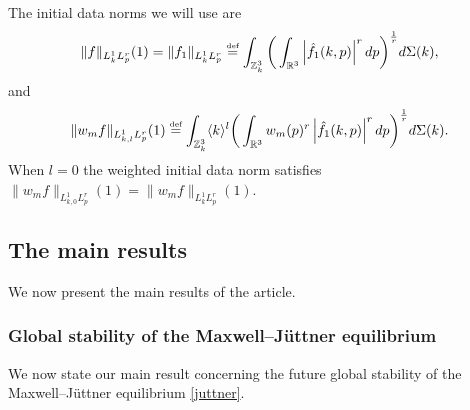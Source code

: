 \documentclass[reqno]{amsart}
\newcommand{\eqdef }{\overset{\mbox{\tiny{def}}}{=}}
\newcommand{\pv}{p}
\def\R{\mathbb R}
\newcommand{\Z}{\mathbb{Z}}
\theoremstyle{definition}
\numberwithin{equation}{section}
\numberwithin{theorem}{section}
\begin{document}
The initial data norms we will use are
\begin{equation*}
\|f\|_{L^1_{k}L^r_{\pv}}(1)= \|f_1\|_{L^1_{k}L^r_{\pv}}
\eqdef
 \int_{\Z^3_{k}} 
\bigg(
\int_{\R^3} 
\left| \hat{f}_1(k,\pv)\right|^r
d\pv
\bigg)^{\frac{1}{r}} 
d\Sigma(k),
\end{equation*}
and
\begin{equation*}
\|w_{m}f\|_{L^1_{k,l}L^r_{\pv}}(1)
\eqdef
 \int_{\Z^3_{k}} \langle k \rangle^l
\bigg(
\int_{\R^3} w_{m}( \pv)^r
\left| \hat{f}_1(k,\pv)\right|^r
d\pv
\bigg)^{\frac{1}{r}} 
d\Sigma(k).
\end{equation*}
When $l=0$ the weighted initial data norm satisfies $\|w_{m}f\|_{L^1_{k,0}L^r_{\pv}}(1) =\|w_{m}f\|_{L^1_{k}L^r_{\pv}}(1)$. 




\subsection{The main results}

We now present the main results of the article. 

\subsubsection{ Global stability of the Maxwell--J\"uttner equilibrium}

We now state our main result concerning the future global stability of the Maxwell--J\"uttner equilibrium \eqref{juttner}.
\end{document}
